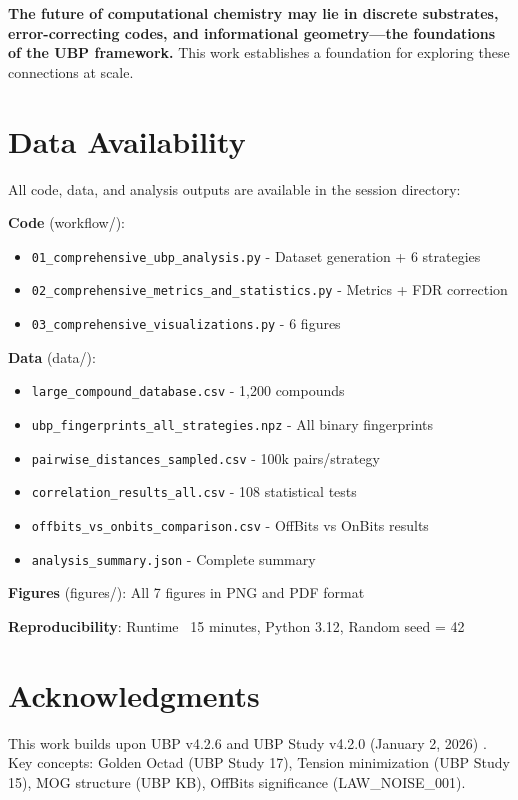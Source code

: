 \documentclass[11pt,letterpaper]{article}
\begin{document}
\textbf{The future of computational chemistry may lie in discrete substrates, error-correcting codes, and informational geometry—the foundations of the UBP framework.} This work establishes a foundation for exploring these connections at scale.

\section{Data Availability}

All code, data, and analysis outputs are available in the session directory:

\textbf{Code} (workflow/):
\begin{itemize}
    \item \texttt{01\_comprehensive\_ubp\_analysis.py} - Dataset generation + 6 strategies
    \item \texttt{02\_comprehensive\_metrics\_and\_statistics.py} - Metrics + FDR correction
    \item \texttt{03\_comprehensive\_visualizations.py} - 6 figures
\end{itemize}

\textbf{Data} (data/):
\begin{itemize}
    \item \texttt{large\_compound\_database.csv} - 1,200 compounds
    \item \texttt{ubp\_fingerprints\_all\_strategies.npz} - All binary fingerprints
    \item \texttt{pairwise\_distances\_sampled.csv} - 100k pairs/strategy
    \item \texttt{correlation\_results\_all.csv} - 108 statistical tests
    \item \texttt{offbits\_vs\_onbits\_comparison.csv} - OffBits vs OnBits results
    \item \texttt{analysis\_summary.json} - Complete summary
\end{itemize}

\textbf{Figures} (figures/): All 7 figures in PNG and PDF format

\textbf{Reproducibility}: Runtime ~15 minutes, Python 3.12, Random seed = 42

\section*{Acknowledgments}

This work builds upon UBP v4.2.6 and UBP Study v4.2.0 (January 2, 2026) \cite{Craig2026}. Key concepts: Golden Octad (UBP Study 17), Tension minimization (UBP Study 15), MOG structure (UBP KB), OffBits significance (LAW\_NOISE\_001).



\end{document}

